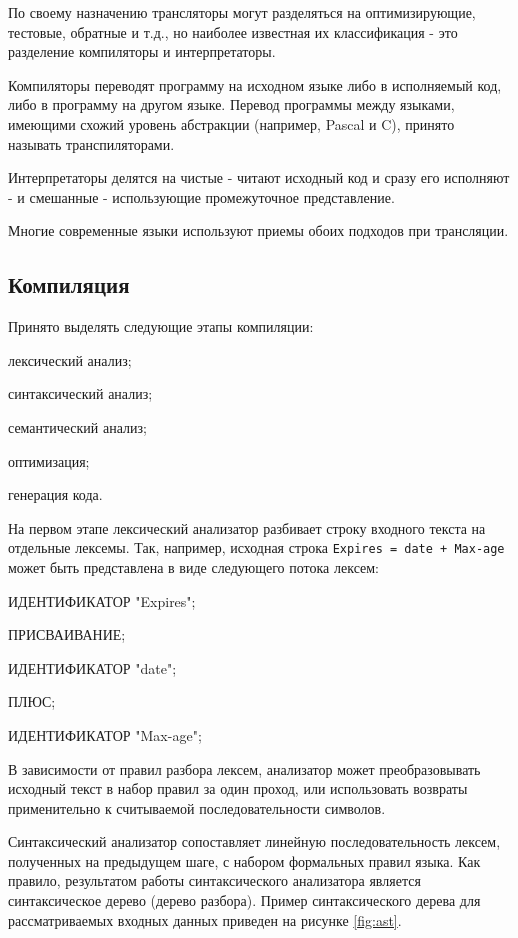 По своему назначению трансляторы могут разделяться на оптимизирующие, тестовые, обратные и т.д., но наиболее известная их классификация - это разделение компиляторы и интерпретаторы.

Компиляторы переводят программу на исходном языке либо в исполняемый код, либо в программу на другом языке. Перевод программы между языками, имеющими схожий уровень абстракции (например, Pascal и C), принято называть транспиляторами.

Интерпретаторы делятся на чистые - читают исходный код и сразу его исполняют - и смешанные - использующие промежуточное представление.

Многие современные языки используют приемы обоих подходов при трансляции.

\subsection{Компиляция}

Принято выделять следующие этапы компиляции:

\begin{enumerate*}
	\item лексический анализ;
	\item синтаксический анализ;
	\item семантический анализ;
	\item оптимизация;
	\item генерация кода.
\end{enumerate*}

На первом этапе лексический анализатор разбивает строку входного текста на отдельные лексемы. Так, например, исходная строка \lstinline|Expires = date + Max-age| может быть представлена в виде следующего потока лексем:

\begin{enumerate*}
	\item ИДЕНТИФИКАТОР "Expires";
	\item ПРИСВАИВАНИЕ;
	\item ИДЕНТИФИКАТОР "date";
	\item ПЛЮС;
	\item ИДЕНТИФИКАТОР "Max-age";
\end{enumerate*}

В зависимости от правил разбора лексем, анализатор может преобразовывать исходный текст в набор правил за один проход, или использовать возвраты применительно к считываемой последовательности символов.

Синтаксический анализатор сопоставляет линейную последовательность лексем, полученных на предыдущем шаге, с набором формальных правил языка. Как правило, результатом работы синтаксического анализатора является синтаксическое дерево (дерево разбора). Пример синтаксического дерева для рассматриваемых входных данных приведен на рисунке \ref{fig:ast}.

